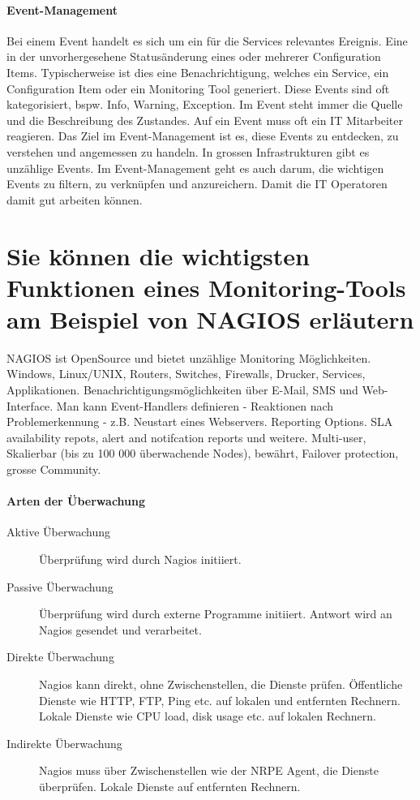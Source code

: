 \paragraph{Event-Management}
Bei einem Event handelt es sich um ein für die Services relevantes Ereignis. Eine in der unvorhergesehene Statusänderung eines oder mehrerer Configuration Items. Typischerweise ist dies eine Benachrichtigung, welches ein Service, ein Configuration Item oder ein Monitoring Tool generiert. Diese Events sind oft kategorisiert, bspw. Info, Warning, Exception. Im Event steht immer die Quelle und die Beschreibung des Zustandes. Auf ein Event muss oft ein IT Mitarbeiter reagieren. Das Ziel im Event-Management ist es, diese Events zu entdecken, zu verstehen und angemessen zu handeln.
In grossen Infrastrukturen gibt es unzählige Events. Im Event-Management geht es auch darum, die wichtigen Events zu filtern, zu verknüpfen und anzureichern. Damit die IT Operatoren damit gut arbeiten können.

\section{Sie können die wichtigsten Funktionen eines Monitoring-Tools am Beispiel von NAGIOS erläutern}

NAGIOS ist OpenSource und bietet unzählige Monitoring Möglichkeiten. Windows, Linux/UNIX, Routers, Switches, Firewalls, Drucker, Services, Applikationen. Benachrichtigungsmöglichkeiten über E-Mail, SMS und Web-Interface. Man kann Event-Handlers definieren - Reaktionen nach Problemerkennung - z.B. Neustart eines Webservers. Reporting Options. SLA availability repots, alert and notifcation reports und weitere. Multi-user, Skalierbar (bis zu 100 000 überwachende Nodes), bewährt, Failover protection, grosse Community.

\paragraph{Arten der Überwachung}
\begin{description}
	\item[Aktive Überwachung] Überprüfung wird durch Nagios initiiert.
	\item[Passive Überwachung] Überprüfung wird durch externe Programme initiiert. Antwort wird an Nagios gesendet und verarbeitet.
	\item[Direkte Überwachung] Nagios kann direkt, ohne Zwischenstellen, die Dienste prüfen. Öffentliche Dienste wie HTTP, FTP, Ping etc. auf lokalen und entfernten Rechnern. Lokale Dienste wie CPU load, disk usage etc. auf lokalen Rechnern.
	\item[Indirekte Überwachung] Nagios muss über Zwischenstellen wie der NRPE Agent, die Dienste überprüfen. Lokale Dienste auf entfernten Rechnern.
\end{description}

